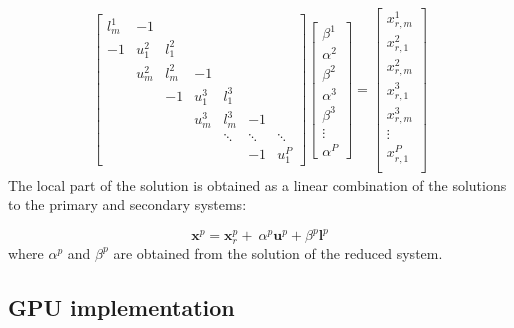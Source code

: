 \documentclass{elsarticle}
\begin{document}
\begin{align} \label{eqn:reduced-system}
&
\begin{bmatrix}
l^1_m & -1 \\
-1    & u^2_1 & l^2_1 \\
      & u^2_m & l^2_m & -1 \\
      &       & -1    & u^3_1 & l^3_1 \\
      &       &       & u^3_m & l^3_m  & -1 \\
      &       &       &       & \ddots & \ddots & \ddots \\
      &       &       &       &        & -1     & u^P_1
\end{bmatrix}
\begin{bmatrix}
\beta^1 \\
\alpha^2 \\
\beta^2 \\
\alpha^3 \\
\beta^3 \\
\vdots \\
\alpha^P
\end{bmatrix}
=
\begin{bmatrix}
x_{r,m}^1 \\
x_{r,1}^2 \\
x_{r,m}^2 \\
x_{r,1}^3 \\
x_{r,m}^3 \\
\vdots \\
x_{r,1}^P \\
\end{bmatrix}
&
\end{align}
The local part of the solution
is obtained as a linear combination of
the solutions to the primary and secondary systems:

\begin{equation}
    \bm{x}^p = \bm{x}_r^p + \
        \alpha^p \bm{u}^p + \beta^p \bm{l}^p
    \label{eqn:sum-of-systems}
\end{equation}
%
where $\alpha^p$ and $\beta^p$ are obtained
from the solution of the reduced system.

\subsection{GPU implementation}
\end{document}
